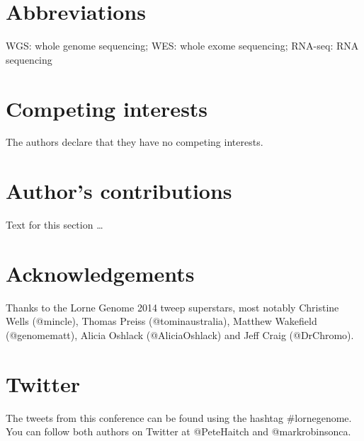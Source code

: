 \documentclass[twocolumn]{bmcart}%
\begin{document}
\begin{backmatter}

\section*{Abbreviations}
WGS: whole genome sequencing; WES: whole exome sequencing; RNA-seq: RNA sequencing

\section*{Competing interests}
  The authors declare that they have no competing interests.

\section*{Author's contributions}
    Text for this section \ldots

\section*{Acknowledgements}
 Thanks to the Lorne Genome 2014 tweep superstars, most notably Christine Wells (@mincle), Thomas Preiss (@tominaustralia), Matthew Wakefield (@genomematt), Alicia Oshlack (@AliciaOshlack) and Jeff Craig (@DrChromo).

\section*{Twitter}
   The tweets from this conference can be found using the hashtag \#lornegenome. You can follow both authors on Twitter at @PeteHaitch and @markrobinsonca.




\end{backmatter}
\end{document}

